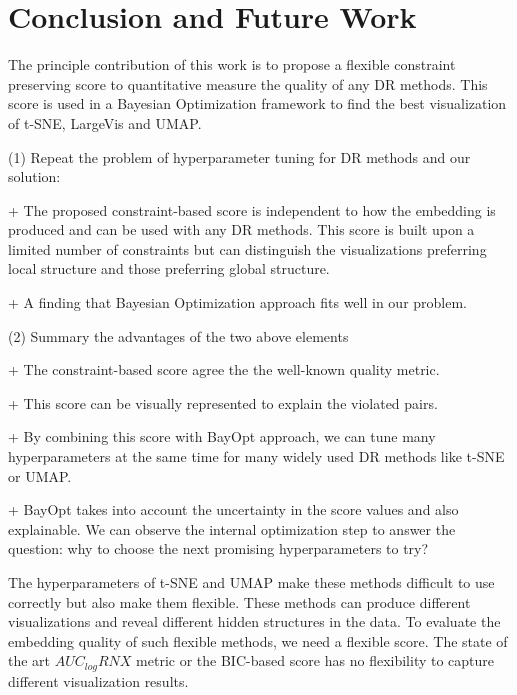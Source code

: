 \section{Conclusion and Future Work}\label{sec:conclusion}
The principle contribution of this work is to propose a flexible constraint preserving score to quantitative measure the quality of any DR methods.
This score is used in a Bayesian Optimization framework to find the best visualization of t-SNE, LargeVis and UMAP.


\par (1) Repeat the problem of hyperparameter tuning for DR methods and our solution:

+ The proposed constraint-based score is independent to how the embedding is produced and can be used with any DR methods.
This score is built upon a limited number of constraints but can distinguish the visualizations preferring local structure and those preferring global structure.

+ A finding that Bayesian Optimization approach fits well in our problem.


\vspace{8pt}
\par (2) Summary the advantages of the two above elements

+ The constraint-based score agree the the well-known quality metric.

+ This score can be visually represented to explain the violated pairs.

+ By combining this score with BayOpt approach, we can tune many hyperparameters at the same time for many widely used DR methods like t-SNE or UMAP.

+ BayOpt takes into account the uncertainty in the score values and also explainable. We can observe the internal optimization step to answer the question: why to choose the next promising hyperparameters to try?

The hyperparameters of t-SNE and UMAP make these methods difficult to use correctly but also make them flexible.
These methods can produce different visualizations and reveal different hidden structures in the data.
To evaluate the embedding quality of such flexible methods, we need a flexible score.
The state of the art $AUC_{log}RNX$ metric or the BIC-based score has no flexibility to capture different visualization results.

